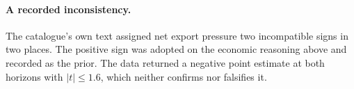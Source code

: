 \paragraph{A recorded inconsistency.} The catalogue's own text assigned net export
pressure two incompatible signs in two places. The positive sign was adopted on the
economic reasoning above and recorded as the prior. The data returned a negative point
estimate at both horizons with $|t|\le1.6$, which neither confirms nor falsifies it.
